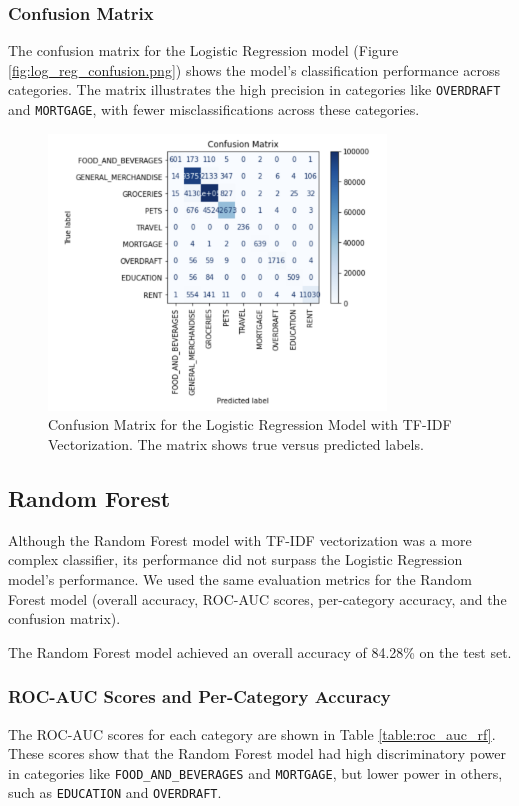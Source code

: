 \documentclass[12pt,letterpaper]{article}
\begin{document}
\subsubsection{Confusion Matrix}
The confusion matrix for the Logistic Regression model (Figure \ref{fig:log_reg_confusion.png}) shows the model's classification performance across categories. The matrix illustrates the high precision in categories like \texttt{OVERDRAFT} and \texttt{MORTGAGE}, with fewer misclassifications across these categories. 

\begin{figure}[h]
    \centering
    \includegraphics[width=0.8\textwidth]{figure/log_reg_confusion.png}
    \caption{Confusion Matrix for the Logistic Regression Model with TF-IDF Vectorization. The matrix shows true versus predicted labels.}
    \label{fig:confusion_matrix_logreg}
\end{figure}

\subsection{Random Forest}

Although the Random Forest model with TF-IDF vectorization was a more complex classifier, its performance did not surpass the Logistic Regression model's performance. We used the same evaluation metrics for the Random Forest model (overall accuracy, ROC-AUC scores, per-category accuracy, and the confusion matrix).

The Random Forest model achieved an overall accuracy of 84.28\% on the test set.

\subsubsection{ROC-AUC Scores and Per-Category Accuracy}
The ROC-AUC scores for each category are shown in Table \ref{table:roc_auc_rf}. These scores show that the Random Forest model had high discriminatory power in categories like \texttt{FOOD\_AND\_BEVERAGES} and \texttt{MORTGAGE}, but lower power in others, such as \texttt{EDUCATION} and \texttt{OVERDRAFT}.
\end{document}

